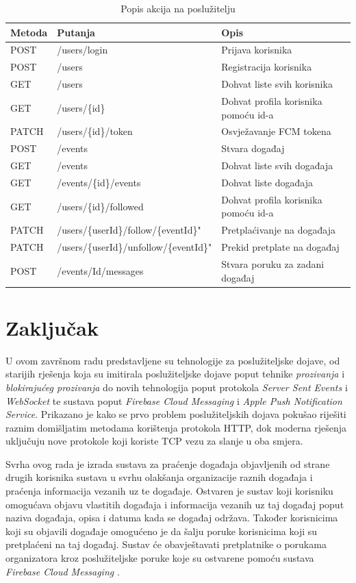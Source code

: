 \documentclass[times, utf8, zavrsni]{fer}
\begin{document}
{\begin{table}[htb]
\caption{Popis akcija na poslužitelju}
\label{tbl:endpoints}
\centering
\begin{tabular}{lll} \hline
Metoda & Putanja & Opis\\ \hline
POST & /users/login & Prijava korisnika\\
POST & /users & Registracija korisnika\\
GET & /users & Dohvat liste svih korisnika\\
GET & /users/\{id\} & Dohvat profila korisnika pomoću id-a\\
PATCH & /users/\{id\}/token & Osvježavanje FCM tokena\\
POST & /events & Stvara događaj\\
GET & /events & Dohvat liste svih događaja\\
GET & /events/\{id\}/events & Dohvat liste događaja\\
GET & /users/\{id\}/followed & Dohvat profila korisnika pomoću id-a\\
PATCH & /users/\{userId\}/follow/\{eventId\}" & Pretplaćivanje na događaja\\
PATCH & /users/\{userId\}/unfollow/\{eventId\}" & Prekid pretplate na događaj\\
POST & /events/{Id}/messages & Stvara poruku za zadani događaj\\ \hline
\end{tabular}
\end{table}

\chapter{Zaključak}

U ovom završnom radu predstavljene su tehnologije za poslužiteljske dojave, od starijih rješenja koja su imitirala poslužiteljske dojave poput tehnike {\em prozivanja} i {\em blokirajućeg prozivanja} do novih tehnologija poput protokola {\em Server Sent Events} i {\em WebSocket} te sustava poput {\em Firebase Cloud Messaging} i {\em Apple Push Notification Service}. Prikazano je kako se prvo problem poslužiteljskih dojava pokušao riješiti raznim domišljatim metodama korištenja protokola HTTP, dok moderna rješenja uključuju nove protokole koji koriste TCP vezu za slanje u oba smjera.

Svrha ovog rada je izrada sustava za praćenje događaja objavljenih od strane drugih korisnika sustava u svrhu olakšanja organizacije raznih događaja i praćenja informacija vezanih uz te događaje. Ostvaren je sustav koji korisniku omogućava objavu vlastitih događaja i informacija vezanih uz taj događaj poput naziva događaja, opisa i datuma kada se događaj održava. Također korisnicima koji su objavili događaje omogućeno je da šalju poruke korisnicima koji su pretplaćeni na taj događaj. Sustav će obavještavati pretplatnike o porukama organizatora kroz poslužiteljske poruke koje su ostvarene pomoću sustava {\em Firebase Cloud Messaging} .

}
\end{document}
